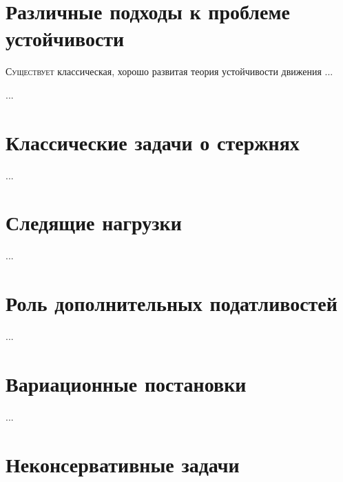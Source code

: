 

\thispagestyle{empty}

\label{chapter:stability}

\begin{otherlanguage}{russian}

\section{Различные подходы к проблеме устойчивости}

\lettrine[lines=2, findent=2pt, nindent=0pt]{С}{уществует} классическая, хорошо развитая теория устойчивости движения ...

...



\section{Классические задачи о стержнях}

...



\section{Следящие нагрузки}

...



\section{Роль дополнительных податливостей}

...



\section{Вариационные постановки}

...



\section{Неконсервативные задачи}


\end{otherlanguage}
